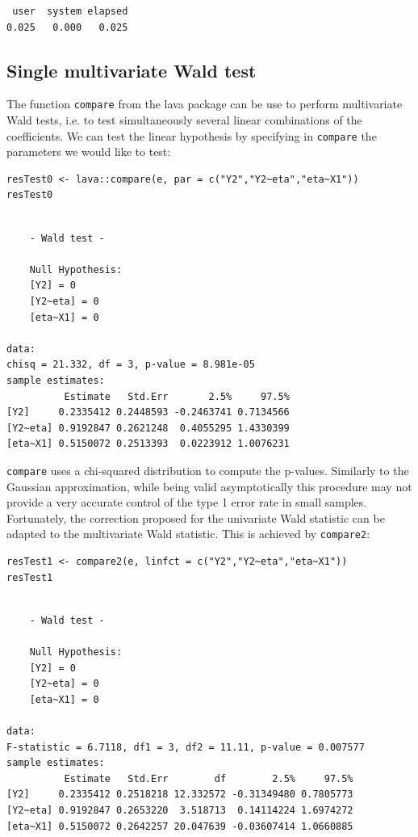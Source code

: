 \documentclass[12pt]{article}
\begin{document}
\begin{verbatim}
 user  system elapsed 
0.025   0.000   0.025
\end{verbatim}

\subsection{Single multivariate Wald test}
\label{sec:org416a566}

The function \texttt{compare} from the lava package can be use to perform
multivariate Wald tests, i.e. to test simultaneously several linear
combinations of the coefficients. We can test the linear hypothesis by
specifying in \texttt{compare} the parameters we would like to test:
\lstset{language=r,label= ,caption= ,captionpos=b,numbers=none}
\begin{lstlisting}
resTest0 <- lava::compare(e, par = c("Y2","Y2~eta","eta~X1"))
resTest0
\end{lstlisting}

\begin{verbatim}

	- Wald test -

	Null Hypothesis:
	[Y2] = 0
	[Y2~eta] = 0
	[eta~X1] = 0

data:  
chisq = 21.332, df = 3, p-value = 8.981e-05
sample estimates:
          Estimate   Std.Err       2.5%     97.5%
[Y2]     0.2335412 0.2448593 -0.2463741 0.7134566
[Y2~eta] 0.9192847 0.2621248  0.4055295 1.4330399
[eta~X1] 0.5150072 0.2513393  0.0223912 1.0076231
\end{verbatim}

\texttt{compare} uses a chi-squared distribution to compute the p-values.
Similarly to the Gaussian approximation, while being valid
asymptotically this procedure may not provide a very accurate control
of the type 1 error rate in small samples. Fortunately, the correction
proposed for the univariate Wald statistic can be adapted to the
multivariate Wald statistic. This is achieved by \texttt{compare2}:
\lstset{language=r,label= ,caption= ,captionpos=b,numbers=none}
\begin{lstlisting}
resTest1 <- compare2(e, linfct = c("Y2","Y2~eta","eta~X1"))
resTest1
\end{lstlisting}

\begin{verbatim}

	- Wald test -

	Null Hypothesis:
	[Y2] = 0
	[Y2~eta] = 0
	[eta~X1] = 0

data:  
F-statistic = 6.7118, df1 = 3, df2 = 11.11, p-value = 0.007577
sample estimates:
          Estimate   Std.Err        df        2.5%     97.5%
[Y2]     0.2335412 0.2518218 12.332572 -0.31349480 0.7805773
[Y2~eta] 0.9192847 0.2653220  3.518713  0.14114224 1.6974272
[eta~X1] 0.5150072 0.2642257 20.047639 -0.03607414 1.0660885
\end{verbatim}
\end{document}
